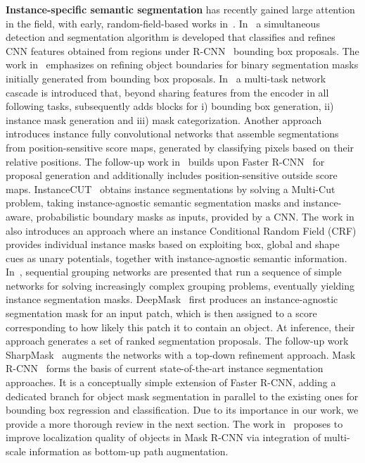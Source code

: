 \documentclass[10pt,twocolumn,letterpaper]{article}
\renewcommand{\paragraph}[1]{
        \vspace{3pt}
	\noindent\textbf{#1}}
\begin{document}
\paragraph{Instance-specific semantic segmentation} has recently gained large attention in the field, with early, random-field-based works in~\cite{He2014,Tighe2014}. In~\cite{Hariharan2014} a simultaneous detection and segmentation algorithm is developed that classifies and refines CNN features obtained from regions under R-CNN~\cite{Gir+14} bounding box proposals. The work in~\cite{Hayder+17} emphasizes on refining object boundaries for binary segmentation masks initially generated from bounding box proposals. In~\cite{dai2016instance} a multi-task network cascade is introduced that, beyond sharing features from the encoder in all following tasks, subsequently adds blocks for i) bounding box generation, ii) instance mask generation and iii) mask categorization. Another approach~\cite{Dai2016} introduces instance fully convolutional networks that assemble segmentations from position-sensitive score maps, generated by classifying pixels based on their relative positions. The follow-up work in~\cite{li2016fully} builds upon Faster R-CNN~\cite{Ren+15} for proposal generation and additionally includes position-sensitive outside score maps. InstanceCUT~\cite{Kirillov17} obtains instance segmentations by solving a Multi-Cut problem, taking instance-agnostic semantic segmentation masks and instance-aware, probabilistic boundary masks as inputs, provided by a CNN. The work in~\cite{Arnab17} also introduces an approach where an instance Conditional Random Field (CRF) provides individual instance masks based on exploiting box, global and shape cues as unary potentials, together with instance-agnostic semantic information. In~\cite{Liu17}, sequential grouping networks are presented that run a sequence of simple networks for solving increasingly complex grouping problems, eventually yielding instance segmentation masks. DeepMask~\cite{Pinheiro15} first produces an instance-agnostic segmentation mask for an input patch, which is then assigned to a score corresponding to how likely this patch it to contain an object. At inference, their approach generates a set of ranked segmentation proposals. The follow-up work SharpMask~\cite{Pinheiro16} augments the networks with a top-down refinement approach. Mask R-CNN~\cite{He2017} forms the basis of current state-of-the-art instance segmentation approaches. It is a conceptually simple extension of Faster R-CNN, adding a dedicated branch for object mask segmentation in parallel to the existing ones for bounding box regression and classification. Due to its importance in our work, we provide a more thorough review in the next section. The work in~\cite{Liu2018} proposes to improve localization quality of objects in Mask R-CNN via integration of multi-scale information as bottom-up path augmentation. 
\end{document}
